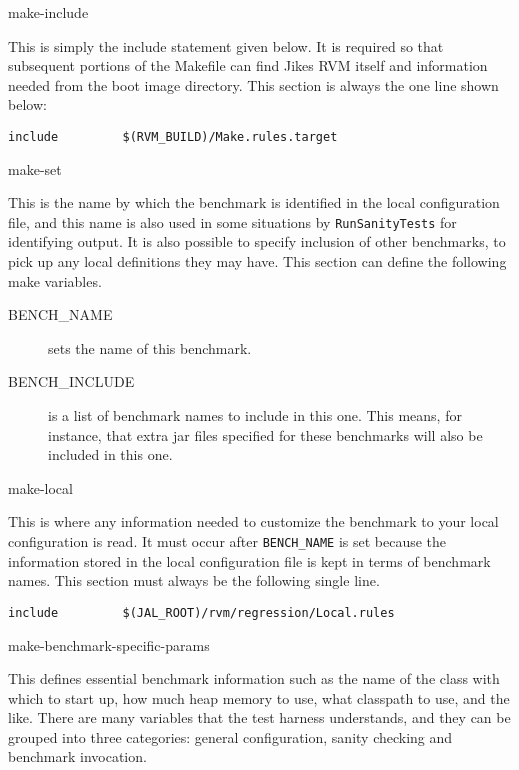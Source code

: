 \begin{description}
\begin{Label}{make-include}
\item[Include the environment rules from the current build directory]
This is simply the include statement given below.  It is required so
that subsequent portions of the Makefile can find Jikes RVM itself
and information needed from the boot image directory.  This section
is always the one line shown below:
\begin{verbatim}
include         $(RVM_BUILD)/Make.rules.target
\end{verbatim}
\end{Label}

\begin{Label}{make-set}
\item[Set the benchmark name]
This is the name by which the benchmark
is identified in the local configuration file, and this name is also
used in some situations by {\tt{RunSanityTests}} for identifying
output.  It is also possible to specify inclusion of other benchmarks,
to pick up any local definitions they may have.  This section can
define the following make variables.
\begin{description}
\item[BENCH\_NAME] sets the name of this benchmark.  
\item[BENCH\_INCLUDE] is a list of benchmark names to include in this
one.  This means, for instance, that extra jar files specified for
these benchmarks will also be included in this one.
\end{description}
\end{Label}


\begin{Label}{make-local}
\item[Include local configuration information, if needed]
This is
where any information needed to customize the benchmark to your local
configuration is read.  It must occur after {\tt{BENCH\_NAME}} is set
because the information stored in the local configuration file is kept
in terms of benchmark names.  This section must always be the
following single line.
\begin{verbatim}
include         $(JAL_ROOT)/rvm/regression/Local.rules
\end{verbatim}
\end{Label}


\begin{Label}{make-benchmark-specific-params}
\item[Define benchmark-specific parameters]
  This defines essential
benchmark information such as the name of the class with which to
start up, how much heap memory to use, what classpath to use, and the
like.  There are many variables that the test harness understands, and
they can be grouped into three categories: general configuration,
sanity checking and benchmark invocation.


\end{Label}
\end{description}
